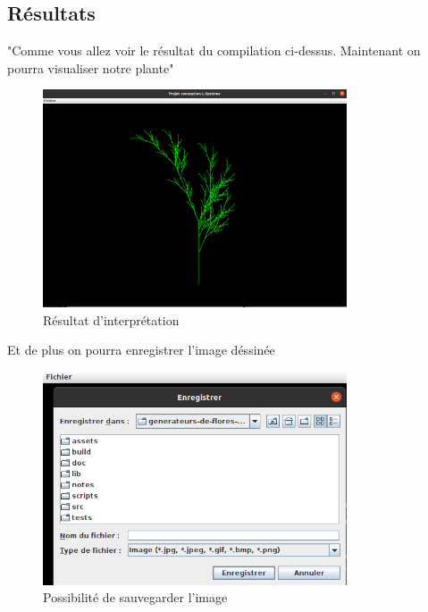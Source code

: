     \subsection{Résultats}
    \Large{"Comme vous allez voir le résultat du compilation ci-dessus. 
    Maintenant on pourra visualiser notre plante"}
      \begin{figure}[h]
      \begin{center}
         \includegraphics[width=9cm]{images/arbre.png}
      \end{center}
        \caption{Résultat d'interprétation}
        \label{fig:paquetage}
    \end{figure}
    
   \Large{Et de plus on pourra enregistrer l'image déssinée}
    
    \begin{figure}[!h]
      \begin{center}
         \includegraphics[width=9cm]{images/save.png}
      \end{center}
        \caption{Possibilité de sauvegarder l'image}
        \label{fig:paquetage}
    \end{figure}
    
